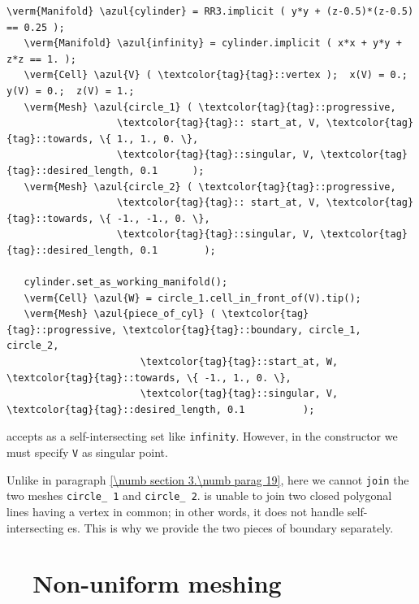 \begin{Verbatim}[commandchars=\\\{\},formatcom=\small\tt,frame=single,
   label=code not working,rulecolor=\color{coment},
   baselinestretch=0.94,framesep=2mm                                  ]
   \verm{Manifold} \azul{cylinder} = RR3.implicit ( y*y + (z-0.5)*(z-0.5) == 0.25 );
   \verm{Manifold} \azul{infinity} = cylinder.implicit ( x*x + y*y + z*z == 1. );
   \verm{Cell} \azul{V} ( \textcolor{tag}{tag}::vertex );  x(V) = 0.;  y(V) = 0.;  z(V) = 1.;
   \verm{Mesh} \azul{circle_1} ( \textcolor{tag}{tag}::progressive,
                   \textcolor{tag}{tag}:: start_at, V, \textcolor{tag}{tag}::towards, \{ 1., 1., 0. \},
                   \textcolor{tag}{tag}::singular, V, \textcolor{tag}{tag}::desired_length, 0.1      );
   \verm{Mesh} \azul{circle_2} ( \textcolor{tag}{tag}::progressive,
                   \textcolor{tag}{tag}:: start_at, V, \textcolor{tag}{tag}::towards, \{ -1., -1., 0. \},
                   \textcolor{tag}{tag}::singular, V, \textcolor{tag}{tag}::desired_length, 0.1        );

   cylinder.set_as_working_manifold();
   \verm{Cell} \azul{W} = circle_1.cell_in_front_of(V).tip();
   \verm{Mesh} \azul{piece_of_cyl} ( \textcolor{tag}{tag}::progressive, \textcolor{tag}{tag}::boundary, circle_1, circle_2,
                       \textcolor{tag}{tag}::start_at, W, \textcolor{tag}{tag}::towards, \{ -1., 1., 0. \},
                       \textcolor{tag}{tag}::singular, V, \textcolor{tag}{tag}::desired_length, 0.1          );
\end{Verbatim}

{\ManiFEM} accepts as {\small\tt {}} a self-intersecting set like {\small\tt infinity}.
However, in the {\small\tt {}} constructor we must specify {\small\tt V} as singular point.

Unlike in paragraph \ref{\numb section 3.\numb parag 19}, here we cannot {\small\tt join} the
two meshes {\small\tt circle\_\,1} and {\small\tt circle\_\,2}.
{\ManiFEM} is unable to join two closed polygonal lines having a vertex in common;
in other words, it does not handle self-intersecting {\small\tt {}}es.
This is why we provide the two pieces of boundary separately.


\section{~~Non-uniform meshing}\label{\numb section 3.\numb parag 22}


